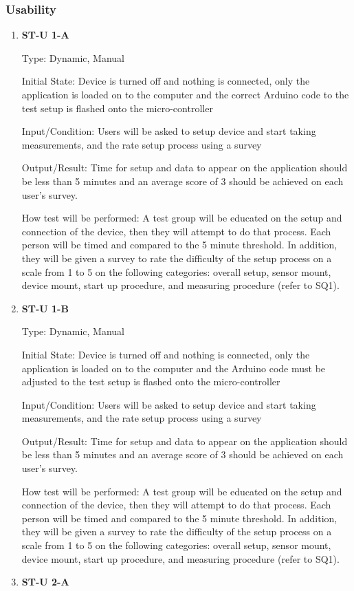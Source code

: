 \documentclass[12pt, titlepage]{article}
\begin{document}
\subsubsection{Usability}

\begin{enumerate}
\item{\bf{ST-U 1-A}}

Type: Dynamic, Manual
          
Initial State: Device is turned off and nothing is connected, only the application is loaded on to the computer and the correct Arduino code to the test setup is flashed onto the micro-controller
          
Input/Condition: Users will be asked to setup device and start taking measurements, and the rate setup process using a survey
          
Output/Result: Time for setup and data to appear on the application should be less than 5 minutes and an average score of 3 should be achieved on each user's survey.
          
How test will be performed: A test group will be educated on the setup and connection of the device, then they will attempt to do that process. 
Each person will be timed and compared to the 5 minute threshold. In addition, they will be given a survey to rate the difficulty of the setup process on a scale from 
1 to 5 on the following categories: overall setup, sensor mount, device mount, start up procedure, and measuring procedure (refer to SQ1).  
\item{\bf{ST-U 1-B}}

Type: Dynamic, Manual
          
Initial State: Device is turned off and nothing is connected, only the application is loaded on to the computer and the Arduino code must be adjusted to the test setup is flashed onto the micro-controller
          
Input/Condition: Users will be asked to setup device and start taking measurements, and the rate setup process using a survey
          
Output/Result: Time for setup and data to appear on the application should be less than 5 minutes and an average score of 3 should be achieved on each user's survey.
          
How test will be performed: A test group will be educated on the setup and connection of the device, then they will attempt to do that process. 
Each person will be timed and compared to the 5 minute threshold. In addition, they will be given a survey to rate the difficulty of the setup process on a scale from 
1 to 5 on the following categories: overall setup, sensor mount, device mount, start up procedure, and measuring procedure (refer to SQ1).  
\item{\bf{ST-U 2-A}}


\end{enumerate}
\end{document}

